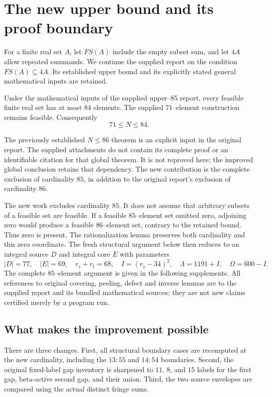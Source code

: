 \section{The new upper bound and its proof boundary}
For a finite real set $A$, let $FS(A)$ include the empty subset sum, and let
$4A$ allow repeated summands. We continue the supplied report on the condition
$FS(A)\subseteq4A$. Its established upper bound and its explicitly stated
general mathematical inputs are retained.

\begin{theorem}
Under the mathematical inputs of the supplied upper--85 report, every feasible
finite real set has at most $84$ elements. The supplied $71$--element
construction remains feasible. Consequently
\[
                       71\le N\le84.
\]
\end{theorem}

The previously established $N\le86$ theorem is an explicit input in the
original report. The supplied attachments do not contain its complete proof
or an identifiable citation for that global theorem. It is not reproved here;
the improved global conclusion retains that dependency. The new contribution
is the complete exclusion of cardinality $85$, in addition to the original
report's exclusion of cardinality $86$.

The new work excludes cardinality $85$. It does not assume that arbitrary
subsets of a feasible set are feasible. If a feasible $85$--element set omitted
zero, adjoining zero would produce a feasible $86$--element set, contrary to
the retained bound. Thus zero is present. The rationalization lemma preserves
both cardinality and this zero coordinate. The fresh structural argument below
then reduces to an integral source $D$ and integral core $E$ with parameters
\[
 |D|=77,\quad |E|=69,\quad r_s+r_t=68,\quad
 I=(r_s-34)^2,\quad \Lambda=1191+I,\quad\Omega=600-I.
\]
The complete $85$--element argument is given in the following supplements.
All references to original covering, peeling, defect and inverse lemmas are to
the supplied report and its bundled mathematical sources; they are not new
claims certified merely by a program run.

\subsection{What makes the improvement possible}
There are three changes. First, all structural boundary cases are recomputed
at the new cardinality, including the $13:55$ and $14:54$ boundaries. Second,
the original fixed-label gap inventory is sharpened to $11$, $8$, and $15$
labels for the first gap, beta-active second gap, and their union. Third, the
two source envelopes are compared using the actual distinct fringe sums.

